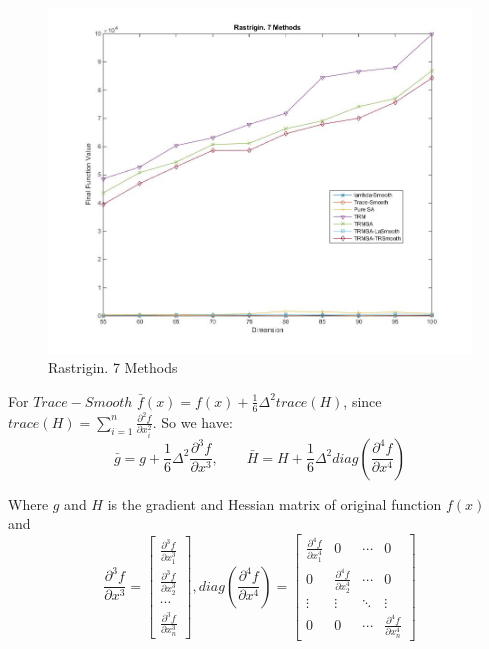 \documentclass[hyperref={pdfpagelabels=false}]{beamer}
\begin{document}

\begin{frame}
\begin{figure}
\includegraphics[scale=0.26]{result6.jpg}
\caption{Rastrigin. 7 Methods}
\end{figure}
\end{frame}


\begin{frame}
For $Trace-Smooth$ $\bar{f}(x)=f(x)+\frac{1}{6}\Delta^2trace(H)$, since $trace(H)=\sum_{i=1}^n\frac{\partial^2 f}{\partial x_i^2}$. So we have:
\begin{equation}
\bar{g}=g+\frac{1}{6}\Delta^2\frac{\partial^3 f}{\partial x^3}, \qquad
\bar{H}=H+\frac{1}{6}\Delta^2diag(\frac{\partial^4 f}{\partial x^4})
\end{equation} 

Where $g$ and $H$ is the gradient and Hessian matrix of original function $f(x)$ and 
\begin{equation}
\frac{\partial^3 f}{\partial x^3}=\left[ \begin{array}{c}
\frac{\partial^3 f}{\partial x_1^3}\\ \frac{\partial^3 f}{\partial x_2^3}\\ \cdots \\ \frac{\partial^3 f}{\partial x_n^3}
\end{array} \right], 
diag(\frac{\partial^4 f}{\partial x^4})=\left[ \begin{array}{cccc}
\frac{\partial^4 f}{\partial x_1^4} & 0 & \cdots & 0 \\
0 & \frac{\partial^4 f}{\partial x_2^4} & \cdots & 0 \\
\vdots & \vdots & \ddots & \vdots \\
0 & 0 & \cdots & \frac{\partial^4 f}{\partial x_n^4}
\end{array} \right]
\end{equation}
\end{frame}
\end{document}
